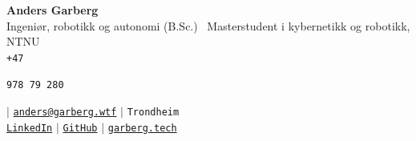 \documentclass[a4paper,11pt]{article}
\newif\ifcvpublic
\newlength{\cvphonewidth}
\begin{document}
\begin{center}
    \textbf{\Huge Anders Garberg} \\ \vspace{5pt}
    \small
    Ingeni{\o}r, robotikk og autonomi (B.Sc.) \textbullet\ Masterstudent i kybernetikk og robotikk, NTNU
    \\ \vspace{7pt}
    \small
    \faPhone* \hspace{2pt} \texttt{+47 }%
    \ifcvpublic
      \settowidth{\cvphonewidth}{\texttt{978 79 280}}\rule[-0.35ex]{\cvphonewidth}{1.5ex}%
    \else
      \texttt{978 79 280}%
    \fi
    \hspace{6pt} $|$ \hspace{6pt}
    \faEnvelope \hspace{2pt} \href{mailto:anders@garberg.wtf}{\texttt{anders@garberg.wtf}} \hspace{6pt} $|$  \hspace{6pt}
    \faMapMarker* \hspace{2pt}\texttt{Trondheim} \hspace{6pt} \\ \vspace{3pt}
    \faLinkedin \hspace{2pt} \href{https://no.linkedin.com/in/anders-garberg}{\texttt{LinkedIn}} \hspace{6pt} $|$ \hspace{6pt}
    \faGithub \hspace{2pt} \href{https://github.com/andersgar/}{\texttt{GitHub}} \hspace{6pt} $|$ \hspace{6pt}
    \faGlobeEurope \hspace{2pt} \href{https://garberg.tech}{\texttt{garberg.tech}} \hspace{6pt}
\end{center}

\end{document}
